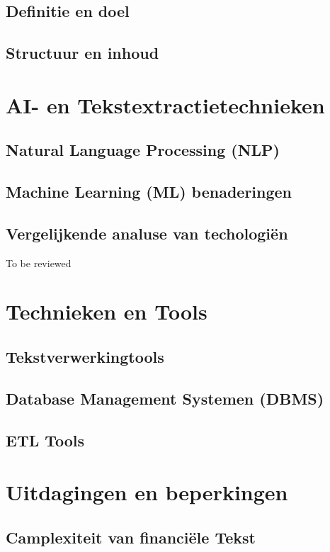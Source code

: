 \subsection{Definitie en doel}
\subsection{Structuur en inhoud}
\section{AI- en Tekstextractietechnieken}
\subsection{Natural Language Processing (NLP)}
\subsection{Machine Learning (ML) benaderingen}
\subsection{Vergelijkende analuse van techologiën}
To be reviewed
\section{Technieken en Tools}
\subsection{Tekstverwerkingtools}
\subsection{Database Management Systemen (DBMS)}
\subsection{ETL Tools}
\section{Uitdagingen en beperkingen}
\subsection{Camplexiteit van financiële Tekst}

